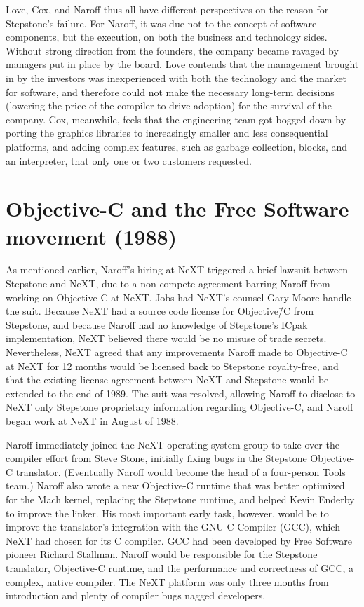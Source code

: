 \documentclass[acmsmall,screen]{acmart}
\begin{document}
Love, Cox, and Naroff thus all have different perspectives on the reason for Stepstone's failure. For Naroff, it was due not to the concept of software components, but the execution, on both the business and technology sides. Without strong direction from the founders, the company became ravaged by managers put in place by the board. Love contends that the management brought in by the investors was inexperienced with both the technology and the market for software, and therefore could not make the necessary long-term decisions (lowering the price of the compiler to drive adoption) for the survival of the company. Cox, meanwhile, feels that the engineering team got bogged down by porting the graphics libraries to increasingly smaller and less consequential platforms, and adding complex features, such as garbage collection, blocks, and an interpreter, that only one or two customers requested. 

\section{Objective-C and the Free Software movement (1988)}
\label{sec-freesoftware1988}
As mentioned earlier, Naroff's hiring at NeXT triggered a brief lawsuit between Stepstone and NeXT, due to a non-compete agreement barring Naroff from working on Objective-C at NeXT. Jobs had NeXT's counsel Gary Moore handle the suit. Because NeXT had a source code license for Objective\=/C from Stepstone, and because Naroff had no knowledge of Stepstone's ICpak implementation, NeXT believed there would be no misuse of trade secrets. Nevertheless, NeXT agreed that any improvements Naroff made to Objective-C at NeXT for 12 months would be licensed back to Stepstone royalty-free, and that the existing license agreement between NeXT and Stepstone would be extended to the end of 1989. The suit was resolved, allowing Naroff to disclose to NeXT only Stepstone proprietary information regarding Objective-C, and Naroff began work at NeXT in August of 1988. 

Naroff immediately joined the NeXT operating system group to take over the compiler effort from Steve Stone, initially fixing bugs in the Stepstone Objective-C translator. (Eventually Naroff would become the head of a four-person Tools team.) Naroff also wrote a new Objective-C runtime that was better optimized for the Mach kernel, replacing the Stepstone runtime, and helped Kevin Enderby to improve the linker. His most important early task, however, would be to improve the translator's integration with the GNU C Compiler (GCC), which NeXT had chosen for its C compiler. GCC had been developed by Free Software pioneer Richard Stallman. Naroff would be responsible for the Stepstone translator, Objective-C runtime, and the performance and correctness of GCC, a complex, native compiler. The NeXT platform was only three months from introduction and plenty of compiler bugs nagged developers.
\end{document}
